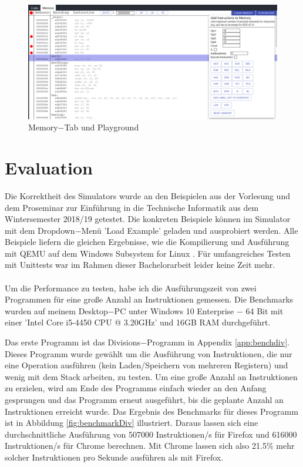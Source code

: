 \documentclass[a4paper, 11pt, onecolumn]{article}
\begin{document}
\begin{figure}[!htb]
\centering
\includegraphics[width=1\textwidth]{data/uimemory}
\caption{Memory$-$Tab und Playground}
\label{fig:uimemory}
\end{figure}

\newpage
\section{Evaluation}\label{sec:eval}

Die Korrektheit des Simulators wurde an den Beispielen aus der Vorlesung und dem Proseminar zur Einführung in die Technische Informatik aus dem Wintersemester 2018/19 getestet. Die konkreten Beispiele können im Simulator mit dem Dropdown$-$Menü 'Load Example' geladen und ausprobiert werden. Alle Beispiele liefern die gleichen Ergebnisse, wie die Kompilierung und Ausführung mit QEMU \cite{qemu} auf dem Windows Subsystem for Linux \cite{wsl}. Für umfangreiches Testen mit Unittests war im Rahmen dieser Bachelorarbeit leider keine Zeit mehr.\\ \\
Um die Performance zu testen, habe ich die Ausführungszeit von zwei Programmen für eine große Anzahl an Instruktionen gemessen. Die Benchmarks wurden auf meinem Desktop$-$PC unter Windows 10 Enterprise $-$ 64 Bit mit einer 'Intel Core i5-4450 CPU @ 3.20GHz' und 16GB RAM durchgeführt.

Das erste Programm ist das Divisions$-$Programm in Appendix \ref{app:benchdiv}. Dieses Programm wurde gewählt um die Ausführung von Instruktionen, die nur eine Operation ausführen (kein Laden/Speichern von mehreren Registern) und wenig mit dem Stack arbeiten, zu testen. Um eine große Anzahl an Instruktionen zu erzielen, wird am Ende des Programms einfach wieder an den Anfang gesprungen und das Programm erneut ausgeführt, bis die geplante Anzahl an Instruktionen erreicht wurde. Das Ergebnis des Benchmarks für dieses Programm ist in Abbildung \ref{fig:benchmarkDiv} illustriert. Daraus lassen sich eine durchschnittliche Ausführung von 507000 Instruktionen/s für Firefox und 616000 Instruktionen/s für Chrome berechnen. Mit Chrome lassen sich also 21.5\% mehr solcher Instruktionen pro Sekunde ausführen als mit Firefox.
\end{document}
